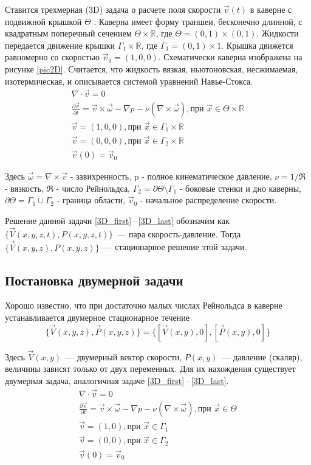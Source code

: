 Ставится трехмерная (3D) задача о расчете поля скорости $ \vec v(t) $ в каверне с подвижной крышкой $ \Theta $ . Каверна имеет форму траншеи, бесконечно длинной, с квадратным поперечный сечением $\Theta \times \mathbb{R} \text{, где } \Theta = (0,1) \times (0,1) $. 
Жидкости передается движение крышки $ \Gamma_1 \times \mathbb{R} \text{, где } \Gamma_1 = (0,1) \times {1} $. 
Крышка движется равномерно со скоростью $ \vec{v}_0 = (1,0,0) $. Схематически каверна изображена 
на рисунке \ref{pic2D}. 
Считается, что жидкость вязкая, ньютоновская, несжимаемая, изотермическая, и описывается системой
уравнений Навье-Стокса.
\begin{gather}
  \nabla \cdot \vec v = 0 \label{3D_first}\\
  \frac{\partial \vec v}{\partial t} = \vec v \times \vec \omega - \nabla p - 
  \nu ( \nabla \times \vec \omega ), \text{при } \vec x \in \Theta \times \mathbb{R}\\
  \vec v = (1,0,0), \text{при } \vec x \in \Gamma_1 \times \mathbb{R} \\
  \vec v = (0,0,0), \text{при } \vec x \in \Gamma_2 \times \mathbb{R} \\
  \vec v (0) = \vec v _0 \label{3D_last}
\end{gather}

Здесь $ \vec \omega = \nabla \times \vec v $ - завихренность, p - полное кинематическое давление,
$ \nu = 1 / \Re $ - вязкость, $ \Re $ - число Рейнольдса, $ \Gamma_2 = \partial \Theta \setminus \Gamma_1 $ - боковые стенки и дно каверны, $ \partial \Theta = \Gamma_1 \cup \Gamma_2 $ - 
граница области, $\vec v _0$ - начальное распределение скорости. 

Решение данной задачи \ref{3D_first}\,--\,\ref{3D_last} обозначим как $ \{ \vec V(x,y,z,t), P(x,y,z,t) \} $~--- пара скорость-давление. Тогда $ \{ \vec V(x,y,z), P(x,y,z) \} $~--- стационарное решение этой задачи. 


\subsection{Постановка двумерной задачи}

Хорошо известно, что при достаточно малых числах Рейнольдса в каверне устанавливается двумерное стационарное течение $$ 
  \{\vec V(x,y,z), \vec P(x,y,z) \} = \{[\vec V(x,y), 0], [\vec P(x,y), 0]\}
$$

Здесь $\vec V(x,y)$~--- двумерный вектор скорости, $P(x,y) $~--- давление (скаляр), величины зависят только от двух переменных. Для их нахождения существует двумерная задача, аналогичная задаче \ref{3D_first}\,--\,\ref{3D_last}.
\begin{gather}
  \label{2D_first}
  \nabla \cdot \vec v = 0 \\
  \frac{\partial \vec v}{\partial t} = \vec v \times \vec \omega - \nabla p - 
  \nu ( \nabla \times \vec \omega ), \text{при } \vec x \in \Theta \\
  \vec v = (1,0), \text{при } \vec x \in \Gamma_1\\
  \vec v = (0,0), \text{при } \vec x \in \Gamma_2\\
  \vec v (0) = \vec v _0
  \label{2D_last}
\end{gather}

